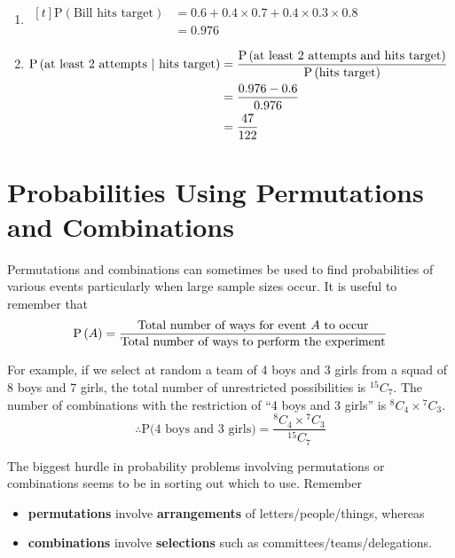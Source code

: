 \documentclass[11pt,a4paper]{book}
\begin{document}
\begin{example}
\begin{enumerate}[label=(\alph*)]
\item
$
\begin{aligned}[t]
\text{P}\left(\text{Bill hits target}\right) & =0.6+0.4\times0.7+0.4\times0.3\times0.8\\
 & =0.976
\end{aligned}
$

\item
$
\begin{aligned}[t]
\text{P}\left(\text{at least 2 attempts \ensuremath{\mid} hits target}\right) & =\frac{\text{P}\left(\text{at least 2 attempts and hits target}\right)}{\text{P}\left(\text{hits target}\right)}\\
 & =\frac{0.976-0.6}{0.976}\\
 & =\frac{47}{122}
\end{aligned}
$

\end{enumerate}
\end{example}

\section{Probabilities Using Permutations and Combinations}

Permutations and combinations can sometimes be used to find probabilities
of various events particularly when large sample sizes occur. It
is useful to remember that
\[
\text{P}\left(A\right)=\frac{\text{Total number of ways for event \ensuremath{A} to occur}}{\text{Total number of ways to perform the experiment}}
\]

For example, if we select at random a team of 4 boys and 3 girls from
a squad of 8 boys and 7 girls, the total number of unrestricted possibilities
is $^{15}C_{7}$. The number of combinations with the restriction
of ``4 boys and 3 girls'' is $^{8}C_{4}\times{}^{7}C_{3}$.
\[
\therefore\text{P(4 boys and 3 girls)}=\frac{^{8}C_{4}\times{}^{7}C_{3}}{^{15}C_{7}}
\]

The biggest hurdle in probability problems involving permutations
or combinations seems to be in sorting out which to use. Remember

\begin{itemize}[leftmargin=2cm]

\item \textbf{permutations} involve \textbf{arrangements} of letters/people/things,
whereas

\item \textbf{combinations} involve \textbf{selections} such as
committees/teams/delegations.

\end{itemize}
\end{document}
